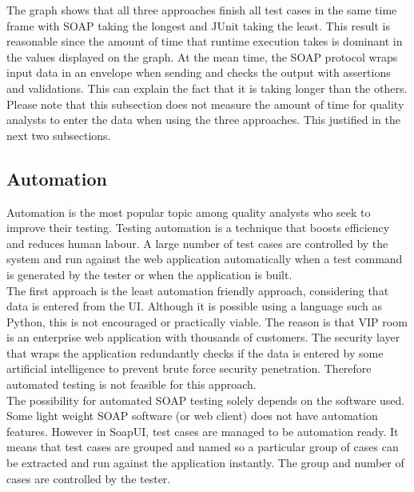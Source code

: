 \documentclass[12pt]{article}
\begin{document}
The graph shows that all three approaches finish all test cases in the same time frame with SOAP taking the longest and JUnit taking the least. This result is reasonable since the amount of time that runtime execution takes is dominant in the values displayed on the graph. At the mean time, the SOAP protocol wraps input data in an envelope when sending and checks the output with assertions and validations. This can explain the fact that it is taking longer than the others. Please note that this subsection does not measure the amount of time for quality analysts to enter the data when using the three approaches. This justified in the next two subsections. \\


\subsection{Automation}
Automation is the most popular topic among quality analysts who seek to improve their testing. Testing automation is a technique that boosts efficiency and reduces human labour. A large number of test cases are controlled by the system and run against the web application automatically when a test command is generated by the tester or when the application is built.\\

The first approach is the least automation friendly approach, considering that data is entered from the UI. Although it is possible using a language such as Python, this is not encouraged or practically viable. The reason is that VIP room is an enterprise web application with thousands of customers. The security layer that wraps the application redundantly checks if the data is entered by some artificial intelligence to prevent brute force security penetration. Therefore automated testing is not feasible for this approach.\\

The possibility for automated SOAP testing solely depends on the software used. Some light weight SOAP software (or web client) does not have automation features. However in SoapUI, test cases are managed to be automation ready. It means that test cases are grouped and named so a particular group of cases can be extracted and run against the application instantly. The group and number of cases are controlled by the tester.
\end{document}
